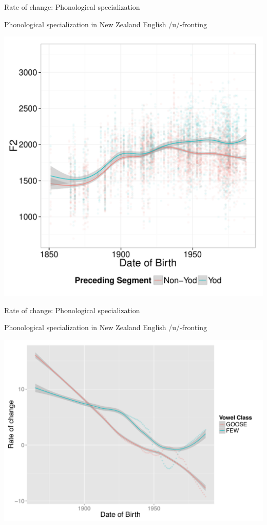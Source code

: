 \documentclass[hyperref={pdfpagelabels=false}]{beamer}
\begin{document}
\begin{frame}{Rate of change: Phonological specialization}
	\begin{block}{\small{Phonological specialization in New Zealand English /u/-fronting}}
	\begin{center}
	\includegraphics[width=.8\textwidth,height=.7\textheight]{ByTokenOldPreceding.pdf}
	\end{center}
	\end{block}	
\end{frame}

\begin{frame}{Rate of change: Phonological specialization}
	\begin{block}{\small{Phonological specialization in New Zealand English /u/-fronting}}
	\begin{center}
	\includegraphics[width=.8\textwidth,height=.7\textheight]{NZEroc.pdf}
	\end{center}
	\end{block}	
\end{frame}
\end{document}
